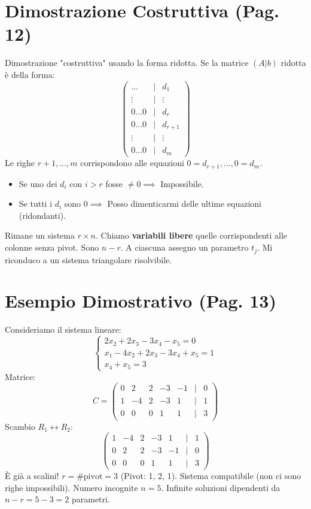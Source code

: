 \section{Dimostrazione Costruttiva (Pag. 12)}

Dimostrazione "costruttiva" usando la forma ridotta.
Se la matrice $(A|b)$ ridotta è della forma:
\[
\begin{pmatrix}
\dots & | & d_1 \\
\vdots & | & \vdots \\
0 \dots 0 & | & d_r \\
0 \dots 0 & | & d_{r+1} \\
\vdots & | & \vdots \\
0 \dots 0 & | & d_m
\end{pmatrix}
\]
Le righe $r+1, \dots, m$ corrispondono alle equazioni $0 = d_{r+1}, \dots, 0 = d_m$.
\begin{itemize}
    \item Se uno dei $d_i$ con $i > r$ fosse $\neq 0 \implies$ Impossibile.
    \item Se tutti i $d_i$ sono $0 \implies$ Posso dimenticarmi delle ultime equazioni (ridondanti).
\end{itemize}
Rimane un sistema $r \times n$.
Chiamo \textbf{variabili libere} quelle corrispondenti alle colonne senza pivot. Sono $n-r$. A ciascuna assegno un parametro $t_j$.
Mi riconduco a un sistema triangolare risolvibile.

\section{Esempio Dimostrativo (Pag. 13)}

Consideriamo il sistema lineare:
\[
\begin{cases}
2x_2 + 2x_3 - 3x_4 - x_5 = 0 \\
x_1 - 4x_2 + 2x_3 - 3x_4 + x_5 = 1 \\
x_4 + x_5 = 3
\end{cases}
\]
Matrice:
\[
C = \begin{pmatrix}
0 & 2 & 2 & -3 & -1 & | & 0 \\
1 & -4 & 2 & -3 & 1 & | & 1 \\
0 & 0 & 0 & 1 & 1 & | & 3
\end{pmatrix}
\]
Scambio $R_1 \leftrightarrow R_2$:
\[
\begin{pmatrix}
1 & -4 & 2 & -3 & 1 & | & 1 \\
0 & 2 & 2 & -3 & -1 & | & 0 \\
0 & 0 & 0 & 1 & 1 & | & 3
\end{pmatrix}
\]
È già a scalini!
$r = \#\text{pivot} = 3$ (Pivot: 1, 2, 1).
Sistema compatibile (non ci sono righe impossibili).
Numero incognite $n=5$.
Infinite soluzioni dipendenti da $n-r = 5-3 = 2$ parametri.

